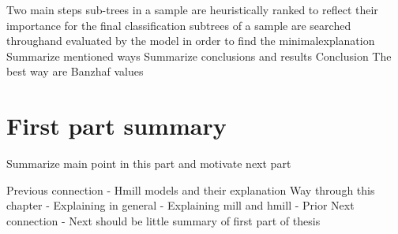 Two main steps
    sub-trees in a sample are heuristically ranked to reflect their importance for the final classification
    subtrees of a sample are searched throughand evaluated by the model in order to find the minimalexplanation
Summarize mentioned ways
Summarize conclusions and results
    Conclusion The best way are Banzhaf values


\section{First part summary}
Summarize main point in this part and motivate next part




Previous connection
- Hmill models and their explanation
Way through this chapter
- Explaining in general
- Explaining mill and hmill
- Prior
Next connection
- Next should be little summary of first part of thesis
